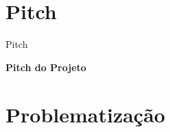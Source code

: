 \documentclass[aspectratio=169]{beamer}
\begin{document}
\section{Pitch}
{
\begin{frame}{Pitch}

\begin{center}

\vspace{2cm}

\Huge \textbf{Pitch do Projeto}

\vspace{1cm}

\href{https://www.youtube.com/watch?v=zmXlzcdq65A}{
}

\end{center}

\end{frame}
}


\section{Problematização}
\end{document}
